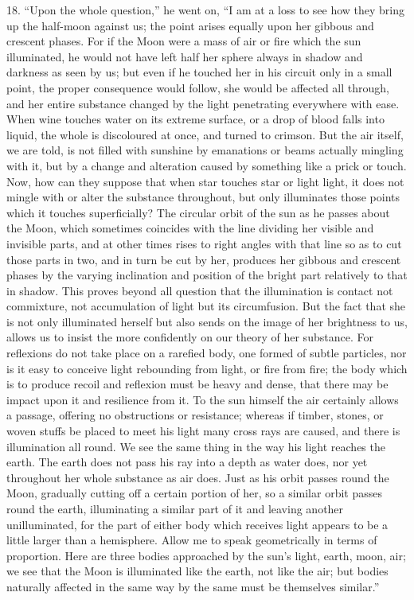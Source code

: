 \documentclass[a4paper, 11pt, oneside, polutonikogreek, english]{article}
\begin{document}
18. ``Upon the whole question,'' he went on, ``I am at a loss to see how they bring up the half-moon against us; the point arises equally upon her gibbous and crescent phases. For if the Moon were a mass of air or fire which the sun illuminated, he would not have left half her sphere always in shadow and darkness as seen by us; but even if he touched her in his circuit only in a small point, the proper consequence would follow, she would be affected all through, and her entire substance changed by the light penetrating everywhere with ease. When wine touches water on its extreme surface, or a drop of blood falls into liquid, the whole is discoloured at once, and turned to crimson. But the air itself, we are told, is not filled with sunshine by emanations or beams actually mingling with it, but by a change and alteration caused by something like a prick or touch. Now, how can they suppose that when star touches star or light light, it does not mingle with or alter the substance throughout, but only illuminates those points which it touches superficially? The circular orbit of the sun as he passes about the Moon, which sometimes coincides with the line dividing her visible and invisible parts, and at other times rises to right angles with that line so as to cut those parts in two, and in turn be cut by her, produces her gibbous and crescent phases by the varying inclination and position of the bright part relatively to that in shadow. This proves beyond all question that the illumination is contact not commixture, not accumulation of light but its circumfusion. But the fact that she is not only illuminated herself but also sends on the image of her brightness to us, allows us to insist the more confidently on our theory of her substance. For reflexions do not take place on a rarefied body, one formed of subtle particles, nor is it easy to conceive light rebounding from light, or fire from fire; the body which is to produce recoil and reflexion must be heavy and dense, that there may be impact upon it and resilience from it. To the sun himself the air certainly allows a passage, offering no obstructions or resistance; whereas if timber, stones, or woven stuffs be placed to meet his light many cross rays are caused, and there is illumination all round. We see the same thing in the way his light reaches the earth. The earth does not pass his ray into a depth as water does, nor yet throughout her whole substance as air does. Just as his orbit passes round the Moon, gradually cutting off a certain portion of her, so a similar orbit passes round the earth, illuminating a similar part of it and leaving another unilluminated, for the part of either body which receives light appears to be a little larger than a hemisphere. Allow me to speak geometrically in terms of proportion. Here are three bodies approached by the sun's light, earth, moon, air; we see that the Moon is illuminated like the earth, not like the air; but bodies naturally affected in the same way by the same must be themselves similar.''
\end{document}
